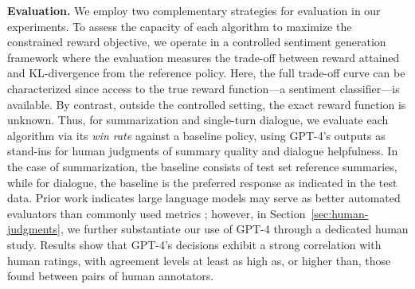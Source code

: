 \textbf{Evaluation.} We employ two complementary strategies for evaluation in our experiments. To assess the capacity of each algorithm to maximize the constrained reward objective, we operate in a controlled sentiment generation framework where the evaluation measures the trade-off between reward attained and KL-divergence from the reference policy. Here, the full trade-off curve can be characterized since access to the true reward function—a sentiment classifier—is available. By contrast, outside the controlled setting, the exact reward function is unknown. Thus, for summarization and single-turn dialogue, we evaluate each algorithm via its \textit{win rate} against a baseline policy, using GPT-4’s outputs as stand-ins for human judgments of summary quality and dialogue helpfulness. In the case of summarization, the baseline consists of test set reference summaries, while for dialogue, the baseline is the preferred response as indicated in the test data. Prior work indicates large language models may serve as better automated evaluators than commonly used metrics \citep{Chen2023ExploringTU}; however, in Section~\ref{sec:human-judgments}, we further substantiate our use of GPT-4 through a dedicated human study. Results show that GPT-4’s decisions exhibit a strong correlation with human ratings, with agreement levels at least as high as, or higher than, those found between pairs of human annotators.

